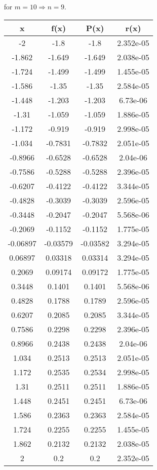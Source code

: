 \documentclass{article}
\begin{document}
for $ m = 10\Rightarrow n = 9 $.
\begin{center}\begin{tabular}{|c|c|c|c|}
\hline
x &f(x) &P(x) &r(x)\\\hline 
-2 &-1.8 &-1.8 &2.352e-05 \\\hline 
-1.862 &-1.649 &-1.649 &2.038e-05 \\\hline 
-1.724 &-1.499 &-1.499 &1.455e-05 \\\hline 
-1.586 &-1.35 &-1.35 &2.584e-05 \\\hline 
-1.448 &-1.203 &-1.203 &6.73e-06 \\\hline 
-1.31 &-1.059 &-1.059 &1.886e-05 \\\hline 
-1.172 &-0.919 &-0.919 &2.998e-05 \\\hline 
-1.034 &-0.7831 &-0.7832 &2.051e-05 \\\hline 
-0.8966 &-0.6528 &-0.6528 &2.04e-06 \\\hline 
-0.7586 &-0.5288 &-0.5288 &2.396e-05 \\\hline 
-0.6207 &-0.4122 &-0.4122 &3.344e-05 \\\hline 
-0.4828 &-0.3039 &-0.3039 &2.596e-05 \\\hline 
-0.3448 &-0.2047 &-0.2047 &5.568e-06 \\\hline 
-0.2069 &-0.1152 &-0.1152 &1.775e-05 \\\hline 
-0.06897 &-0.03579 &-0.03582 &3.294e-05 \\\hline 
0.06897 &0.03318 &0.03314 &3.294e-05 \\\hline 
0.2069 &0.09174 &0.09172 &1.775e-05 \\\hline 
0.3448 &0.1401 &0.1401 &5.568e-06 \\\hline 
0.4828 &0.1788 &0.1789 &2.596e-05 \\\hline 
0.6207 &0.2085 &0.2085 &3.344e-05 \\\hline 
0.7586 &0.2298 &0.2298 &2.396e-05 \\\hline 
0.8966 &0.2438 &0.2438 &2.04e-06 \\\hline 
1.034 &0.2513 &0.2513 &2.051e-05 \\\hline 
1.172 &0.2535 &0.2534 &2.998e-05 \\\hline 
1.31 &0.2511 &0.2511 &1.886e-05 \\\hline 
1.448 &0.2451 &0.2451 &6.73e-06 \\\hline 
1.586 &0.2363 &0.2363 &2.584e-05 \\\hline 
1.724 &0.2255 &0.2255 &1.455e-05 \\\hline 
1.862 &0.2132 &0.2132 &2.038e-05 \\\hline 
2 &0.2 &0.2 &2.352e-05 \\\hline 
\end{tabular}
\end{center}
\end{document}

